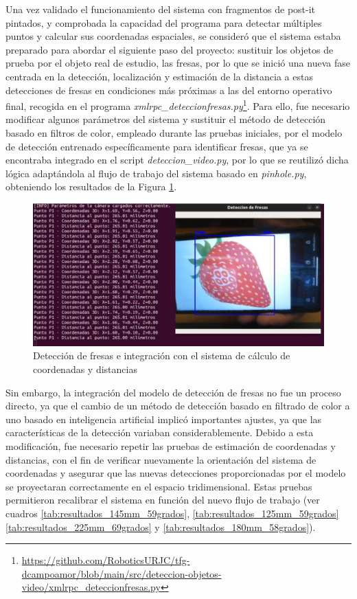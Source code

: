 Una vez validado el funcionamiento del sistema con fragmentos de post-it pintados, y comprobada la capacidad del programa para detectar múltiples puntos y calcular sus coordenadas espaciales, se consideró que el sistema estaba preparado para abordar el siguiente paso del proyecto: sustituir los objetos de prueba por el objeto real de estudio, las fresas, por lo que se inició una nueva fase centrada en la detección, localización y estimación de la distancia a estas detecciones de fresas en condiciones más próximas a las del entorno operativo final, recogida en el programa \textit{xmlrpc\_deteccionfresas.py}\footnote{\url{https://github.com/RoboticsURJC/tfg-dcampoamor/blob/main/src/deteccion-objetos-video/xmlrpc_deteccionfresas.py}}. Para ello, fue necesario modificar algunos parámetros del sistema y sustituir el método de detección basado en filtros de color, empleado durante las pruebas iniciales, por el modelo de detección entrenado específicamente para identificar fresas, que ya se encontraba integrado en el script \textit{deteccion\_video.py}, por lo que se reutilizó dicha lógica adaptándola al flujo de trabajo del sistema basado en \textit{pinhole.py}, obteniendo los resultados de la Figura \ref{fig:union_scripts_fresas}.

  \begin{figure}[H]
    \centering
    \begin{center}
      \includegraphics[width=155mm]{figs/Pruebas deteccion fresas y obtencion coordenadas varios codigos.png}
    \end{center}
    \caption{Detección de fresas e integración con el sistema de cálculo de coordenadas y distancias}
    \label{fig:union_scripts_fresas}
  \end{figure}

Sin embargo, la integración del modelo de detección de fresas no fue un proceso directo, ya que el cambio de un método de detección basado en filtrado de color a uno basado en inteligencia artificial implicó importantes ajustes, ya que las características de la detección variaban considerablemente. Debido a esta modificación, fue necesario repetir las pruebas de estimación de coordenadas y distancias, con el fin de verificar nuevamente la orientación del sistema de coordenadas y asegurar que las nuevas detecciones proporcionadas por el modelo se proyectaran correctamente en el espacio tridimensional. Estas pruebas permitieron recalibrar el sistema en función del nuevo flujo de trabajo (ver cuadros \ref{tab:resultados_145mm_59grados}, \ref{tab:resultados_125mm_59grados} \ref{tab:resultados_225mm_69grados} y \ref{tab:resultados_180mm_58grados}).

